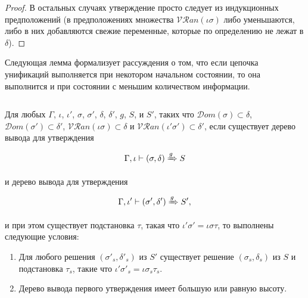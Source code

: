 \begin{proof}
      В остальных случаях утверждение просто следует из индукционных предположений (в предположениях множества $\mathcal{VR}an(\iota \sigma)$ либо уменьшаются, либо в них добавляются свежие переменные, которые по определению не лежат в $\delta$).
      
    \end{proof}
  
    Следующая лемма формализует рассуждения о том, что если цепочка унификаций выполняется при некотором начальном состоянии, то она выполнится и при состоянии с меньшим количеством информации.
    
    \begin{lemma}$ $\par\nobreak\ignorespaces
    	  Для любых $\Gamma$, $\iota$, $\iota'$, $\sigma$, $\sigma'$, $\delta$, $\delta'$, $g$, $S$, и $S'$, таких что $\mathcal{D}om(\sigma) \subset \delta$, $\mathcal{D}om(\sigma') \subset \delta'$, $\mathcal{VR}an(\iota \sigma) \subset \delta$ и  $\mathcal{VR}an(\iota' \sigma') \subset \delta'$, если существует дерево вывода для утверждения
    		
    	  \[\Gamma, \iota \vdash (\sigma, \delta) \xRightarrow{g} S\]
    		
    	  и дерево вывода для утверждения
    		
    	  \[\Gamma, \iota' \vdash (\sigma', \delta') \xRightarrow{g} S',\]
    		
    	  и при этом существует подстановка $\tau$, такая что $\iota' \sigma' = \iota \sigma \tau$, то выполнены следующие условия:
    		
    	  \begin{enumerate}
        \item Для любого решения $(\sigma'_s, \delta'_s)$ из $S'$ существует решение $(\sigma_s, \delta_s)$ из $S$ и подстановка $\tau_s$, такие что $\iota' \sigma'_s = \iota \sigma_s \tau_s$.
        \item Дерево вывода первого утверждения имеет большую или равную высоту.
      \end{enumerate}
    \end{lemma}
